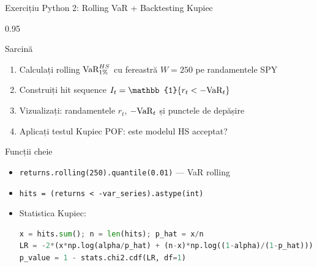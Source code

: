 \documentclass[9pt, aspectratio=169, t]{beamer}
\begin{document}
\begin{frame}[fragile,shrink=10]{Exercițiu Python 2: Rolling VaR + Backtesting Kupiec}
\begin{cminipage}{0.95\textwidth}
    \begin{block}{Sarcină}
    \begin{enumerate}\setlength{\itemsep}{0pt}
        \item Calculați rolling $\text{VaR}_{1\%}^{HS}$ cu fereastră $W = 250$ pe randamentele SPY
        \item Construiți hit sequence $I_t = \mathbb{1}\{r_t < -\VaR_t\}$
        \item Vizualizați: randamentele $r_t$, $-\text{VaR}_t$ și punctele de depășire
        \item Aplicați testul Kupiec POF: este modelul HS acceptat?
    \end{enumerate}
    \end{block}
    \vspace{0.15cm}
    \begin{alertblock}{Funcții cheie}
    \begin{itemize}\setlength{\itemsep}{0pt}
        \item \texttt{returns.rolling(250).quantile(0.01)} --- VaR rolling
        \item \texttt{hits = (returns < -var\_series).astype(int)}
        \item Statistica Kupiec:
        \begin{lstlisting}[language=Python]
x = hits.sum(); n = len(hits); p_hat = x/n
LR = -2*(x*np.log(alpha/p_hat) + (n-x)*np.log((1-alpha)/(1-p_hat)))
p_value = 1 - stats.chi2.cdf(LR, df=1)
        \end{lstlisting}
    \end{itemize}
    \end{alertblock}
\end{cminipage}
\end{frame}
\end{document}
